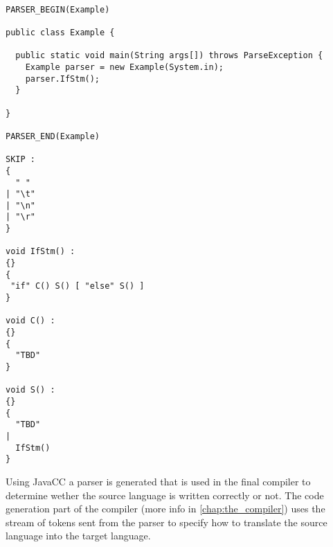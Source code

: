 \begin{lstlisting}[caption={One of JavaCC's standard examples on how to make a grammar that accepts ``if''-statements.}, label=lst:javacc-grammar-example]

PARSER_BEGIN(Example)

public class Example {

  public static void main(String args[]) throws ParseException {
    Example parser = new Example(System.in);
    parser.IfStm();
  }

}

PARSER_END(Example)

SKIP :
{
  " "
| "\t"
| "\n"
| "\r"
}

void IfStm() :
{}
{
 "if" C() S() [ "else" S() ]
}

void C() :
{}
{
  "TBD"
}

void S() :
{}
{
  "TBD"
|
  IfStm()
}
\end{lstlisting}

Using JavaCC a parser is generated that is used in the final compiler to determine wether the source language is written correctly or not. The code generation part of the compiler (more info in \ref{chap:the_compiler}) uses the stream of tokens sent from the parser to specify how to translate the source language into the target language. 